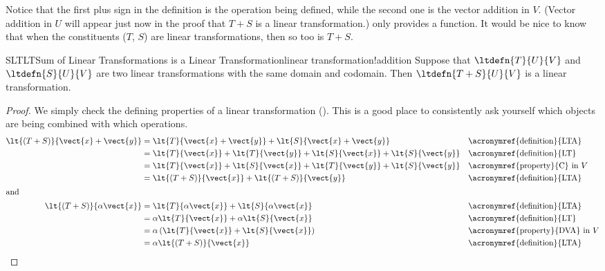 %
Notice that the first plus sign in the definition is the operation being defined, while the second one is the vector addition in $V$.  (Vector addition in $U$ will appear just now in the proof that $T+S$ is a linear transformation.)   only provides a function.  It would be nice to know that when the constituents ($T$, $S$) are linear transformations, then so too is $T+S$.
%
\begin{theorem}{SLTLT}{Sum of Linear Transformations is a Linear Transformation}{linear transformation!addition}
Suppose that $\ltdefn{T}{U}{V}$ and $\ltdefn{S}{U}{V}$ are two linear transformations with the same domain and codomain.  Then $\ltdefn{T+S}{U}{V}$ is a linear transformation.
\end{theorem}
%
\begin{proof}
We simply check the defining properties of a linear transformation ().  This is a good place to consistently ask yourself which objects are being combined with which operations.
%
\begin{align*}
\lt{(T+S)}{\vect{x}+\vect{y}}&=
\lt{T}{\vect{x}+\vect{y}}+\lt{S}{\vect{x}+\vect{y}}&&\text{\acronymref{definition}{LTA}}\\
&=\lt{T}{\vect{x}}+\lt{T}{\vect{y}}+\lt{S}{\vect{x}}+\lt{S}{\vect{y}}&&\text{\acronymref{definition}{LT}}\\
&=\lt{T}{\vect{x}}+\lt{S}{\vect{x}}+\lt{T}{\vect{y}}+\lt{S}{\vect{y}}&&\text{\acronymref{property}{C} in $V$}\\
&=\lt{(T+S)}{\vect{x}}+\lt{(T+S)}{\vect{y}}&&\text{\acronymref{definition}{LTA}}\\
%
\intertext{and}
%
\lt{(T+S)}{\alpha\vect{x}}&=
\lt{T}{\alpha\vect{x}}+\lt{S}{\alpha\vect{x}}&&\text{\acronymref{definition}{LTA}}\\
&=\alpha\lt{T}{\vect{x}}+\alpha\lt{S}{\vect{x}}&&\text{\acronymref{definition}{LT}}\\
&=\alpha\left(\lt{T}{\vect{x}}+\lt{S}{\vect{x}}\right)&&\text{\acronymref{property}{DVA} in $V$}\\
&=\alpha\lt{(T+S)}{\vect{x}}&&\text{\acronymref{definition}{LTA}}\\
\end{align*}
%
\end{proof}
%
